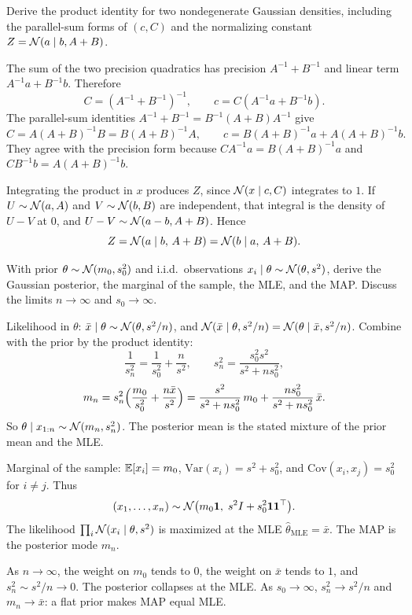 \begin{hwqbox}
Derive the product identity for two nondegenerate Gaussian densities, including the parallel-sum forms of $(c,C)$ and the normalizing constant $Z=\mathcal{N}(a\mid b,A+B)$.
\end{hwqbox}
\begin{hwsolbox}
The sum of the two precision quadratics has precision $A^{-1}+B^{-1}$ and linear term $A^{-1}a+B^{-1}b$. Therefore
\[
C=(A^{-1}+B^{-1})^{-1},\qquad c=C(A^{-1}a+B^{-1}b).
\]
The parallel-sum identities $A^{-1}+B^{-1}=B^{-1}(A+B)A^{-1}$ give
\[
C=A(A+B)^{-1}B=B(A+B)^{-1}A,\qquad
c=B(A+B)^{-1}a+A(A+B)^{-1}b.
\]
They agree with the precision form because $CA^{-1}a=B(A+B)^{-1}a$ and $CB^{-1}b=A(A+B)^{-1}b$.

Integrating the product in $x$ produces $Z$, since $\mathcal{N}(x\mid c,C)$ integrates to $1$. If $U\sim\mathcal{N}(a,A)$ and $V\sim\mathcal{N}(b,B)$ are independent, that integral is the density of $U-V$ at $0$, and $U-V\sim\mathcal{N}(a-b,A+B)$. Hence
\[
Z=\mathcal{N}(a\mid b,\,A+B)=\mathcal{N}(b\mid a,\,A+B).
\]
\end{hwsolbox}

\begin{hwqbox}
With prior $\theta\sim\mathcal{N}(m_0,s_0^2)$ and i.i.d.\ observations $x_i\mid\theta\sim\mathcal{N}(\theta,s^2)$, derive the Gaussian posterior, the marginal of the sample, the MLE, and the MAP. Discuss the limits $n\to\infty$ and $s_0\to\infty$.
\end{hwqbox}
\begin{hwsolbox}
Likelihood in $\theta$: $\bar x\mid\theta\sim\mathcal{N}(\theta,s^2/n)$, and $\mathcal{N}(\bar x\mid\theta,s^2/n)=\mathcal{N}(\theta\mid\bar x,s^2/n)$. Combine with the prior by the product identity:
\[
\frac1{s_n^2}=\frac1{s_0^2}+\frac n{s^2},\qquad
s_n^2=\frac{s_0^2 s^2}{s^2+n s_0^2},
\]
\[
m_n=s_n^2\Bigl(\frac{m_0}{s_0^2}+\frac{n\bar x}{s^2}\Bigr)
=\frac{s^2}{s^2+n s_0^2}\,m_0+\frac{n s_0^2}{s^2+n s_0^2}\,\bar x.
\]
So $\theta\mid x_{1:n}\sim\mathcal{N}(m_n,s_n^2)$. The posterior mean is the stated mixture of the prior mean and the MLE.

Marginal of the sample: $\mathbb{E}[x_i]=m_0$, $\mathrm{Var}(x_i)=s^2+s_0^2$, and $\mathrm{Cov}(x_i,x_j)=s_0^2$ for $i\ne j$. Thus
\[
(x_1,\ldots,x_n)\sim\mathcal{N}\bigl(m_0\mathbf 1,\; s^2 I+s_0^2\mathbf 1\mathbf 1^\top\bigr).
\]
The likelihood $\prod_i\mathcal{N}(x_i\mid\theta,s^2)$ is maximized at the MLE $\hat\theta_{\mathrm{MLE}}=\bar x$. The MAP is the posterior mode $m_n$.

As $n\to\infty$, the weight on $m_0$ tends to $0$, the weight on $\bar x$ tends to $1$, and $s_n^2\sim s^2/n\to 0$. The posterior collapses at the MLE. As $s_0\to\infty$, $s_n^2\to s^2/n$ and $m_n\to\bar x$: a flat prior makes MAP equal MLE.
\end{hwsolbox}

